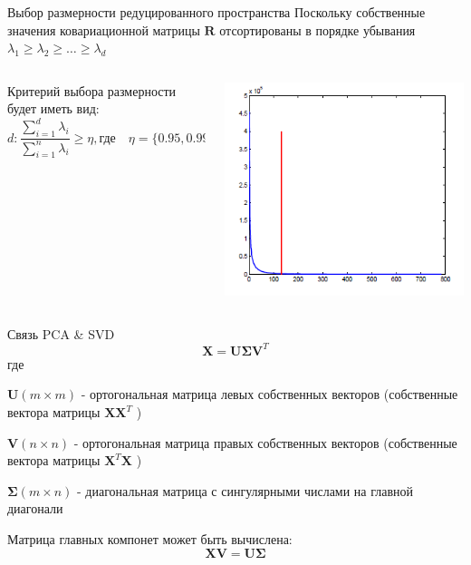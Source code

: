 \documentclass[10pt]{beamer}
\begin{document}
\begin{frame}{Выбор размерности редуцированного пространства}
Поскольку собственные значения ковариационной матрицы $\mathbf{R}$ отсортированы в
порядке убывания $\lambda_1 \ge \lambda_2 \ge \ldots \ge \lambda_d$

\vspace{1em}
\begin{columns}[C]
        \begin{column}{.5\textwidth}
        Критерий выбора размерности будет иметь вид:
        \[
            d: \frac{\sum \limits_{i=1}^{d} \lambda_i}{\sum \limits _{i=1}^{n} \lambda_i} \ge
            \eta, \text{где} \quad \eta=\{0.95, 0.99\}
        \]
        \end{column}
        \begin{column}{.5\textwidth}
            \includegraphics[scale=0.3]{images/numcomp.png}
        \end{column}
\end{columns}
\end{frame}

\begin{frame}{Связь PCA \& SVD}
\[
    \mathbf{X} = \mathbf{U} \mathbf{\Sigma} \mathbf{V}^T
\]
где

$\mathbf{U} (m \times m)$ - ортогональная матрица левых собственных векторов (собственные
вектора матрицы $\mathbf{X} \mathbf{X}^T$ )
    
$\mathbf{V} (n \times n)$ - ортогональная матрица правых собственных векторов (собственные
вектора матрицы $\mathbf{X}^T \mathbf{X}$ )

$\mathbf{\Sigma} (m \times n)$ - диагональная матрица с сингулярными числами на главной диагонали

\vspace{1em}

Матрица главных компонет может быть вычислена:
\[
    \mathbf{X} \mathbf{V} = \mathbf{U} \mathbf{\Sigma} 
\]
\end{frame}
\end{document}
